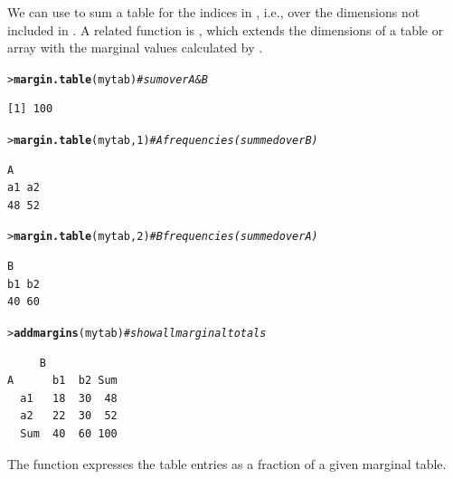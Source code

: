 \documentclass[10pt,krantz2]{krantz}\usepackage[]{graphicx}\usepackage[]{color}
\makeatletter
\newcommand{\hlnum}[1]{\textcolor[rgb]{0.686,0.059,0.569}{#1}}%
\newcommand{\hlcom}[1]{\textcolor[rgb]{0.678,0.584,0.686}{\textit{#1}}}%
\newcommand{\hlstd}[1]{\textcolor[rgb]{0.345,0.345,0.345}{#1}}%
\newcommand{\hlkwd}[1]{\textcolor[rgb]{0.737,0.353,0.396}{\textbf{#1}}}%
\newenvironment{kframe}{%
 \def\at@end@of@kframe{}%
 \ifinner\ifhmode%
  \def\at@end@of@kframe{\end{minipage}}%
  \begin{minipage}{\columnwidth}%
 \fi\fi%
 \def\FrameCommand##1{\hskip\@totalleftmargin \hskip-\fboxsep
 \colorbox{shadecolor}{##1}\hskip-\fboxsep
     \hskip-\linewidth \hskip-\@totalleftmargin \hskip\columnwidth}%
 \MakeFramed {\advance\hsize-\width
   \@totalleftmargin\z@ \linewidth\hsize
   \@setminipage}}%
 {\par\unskip\endMakeFramed%
 \at@end@of@kframe}
\newenvironment{knitrout}{}{} %
\renewenvironment{knitrout}{\small\renewcommand{\baselinestretch}{.85}}{} %
\makeatother
\begin{document}
We can use  to sum a table  for
the indices in , i.e., over the dimensions not included
in .
A related function is ,
which extends the dimensions of a table or array with the marginal values calculated
by .

\begin{knitrout}
\color{fgcolor}\begin{kframe}
\begin{alltt}
\hlstd{> }\hlkwd{margin.table}\hlstd{(mytab)}      \hlcom{# sum over A & B}
\end{alltt}
\begin{verbatim}
[1] 100
\end{verbatim}
\begin{alltt}
\hlstd{> }\hlkwd{margin.table}\hlstd{(mytab,} \hlnum{1}\hlstd{)}   \hlcom{# A frequencies (summed over B)}
\end{alltt}
\begin{verbatim}
A
a1 a2 
48 52 
\end{verbatim}
\begin{alltt}
\hlstd{> }\hlkwd{margin.table}\hlstd{(mytab,} \hlnum{2}\hlstd{)}   \hlcom{# B frequencies (summed over A)}
\end{alltt}
\begin{verbatim}
B
b1 b2 
40 60 
\end{verbatim}
\begin{alltt}
\hlstd{> }\hlkwd{addmargins}\hlstd{(mytab)}        \hlcom{# show all marginal totals}
\end{alltt}
\begin{verbatim}
     B
A      b1  b2 Sum
  a1   18  30  48
  a2   22  30  52
  Sum  40  60 100
\end{verbatim}
\end{kframe}
\end{knitrout}
The function  expresses the table entries as a fraction of
a given marginal table.
\end{document}

